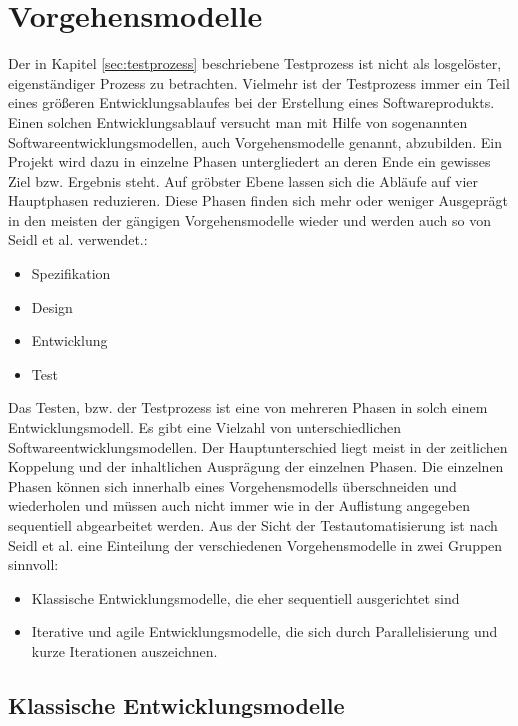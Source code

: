 \section{Vorgehensmodelle}
\label{sec:vorgehensmodelle}
Der in Kapitel \ref{sec:testprozess} beschriebene Testprozess ist nicht als losgelöster, eigenständiger Prozess zu betrachten. Vielmehr ist der Testprozess immer ein Teil eines größeren Entwicklungsablaufes bei der Erstellung eines Softwareprodukts. Einen solchen Entwicklungsablauf versucht man mit Hilfe von sogenannten Softwareentwicklungsmodellen, auch Vorgehensmodelle genannt, abzubilden.
Ein Projekt wird dazu in einzelne Phasen untergliedert an deren Ende ein gewisses Ziel bzw. Ergebnis steht.
Auf gröbster Ebene lassen sich die Abläufe auf vier Hauptphasen reduzieren. Diese Phasen finden sich mehr oder weniger Ausgeprägt in den meisten der gängigen Vorgehensmodelle wieder und werden auch so von Seidl et al. \cite[S.21 ff.]{seidl_basiswissen_2012} verwendet.:

\begin{itemize}
\item Spezifikation
\item Design
\item Entwicklung
\item Test
\end{itemize}

Das Testen, bzw. der Testprozess ist eine von mehreren Phasen in solch einem Entwicklungsmodell.
Es gibt eine Vielzahl von unterschiedlichen Softwareentwicklungsmodellen. Der Hauptunterschied liegt meist in der zeitlichen Koppelung und der inhaltlichen Ausprägung der einzelnen Phasen. Die einzelnen Phasen können sich innerhalb eines Vorgehensmodells überschneiden und wiederholen und müssen auch nicht immer wie in der Auflistung angegeben sequentiell abgearbeitet werden.
Aus der Sicht der Testautomatisierung ist nach Seidl et al. \cite[vgl. S.21 ff.]{seidl_basiswissen_2012} eine Einteilung der verschiedenen Vorgehensmodelle in zwei Gruppen sinnvoll: 

\begin{itemize}
\item Klassische Entwicklungsmodelle, die eher sequentiell ausgerichtet sind
\item Iterative und agile Entwicklungsmodelle, die sich durch Parallelisierung und kurze Iterationen auszeichnen.
\end{itemize}

\subsection{Klassische Entwicklungsmodelle}
\label{subsec:klassische_entwicklungsmodelle}

